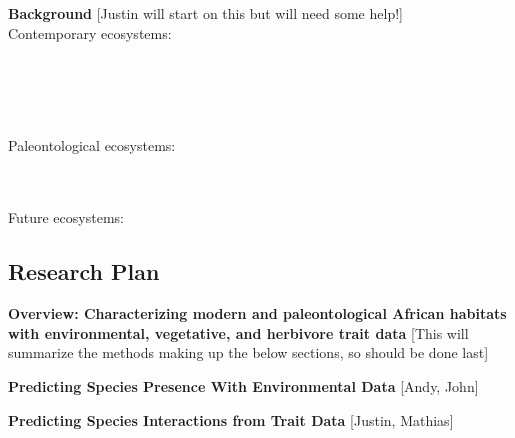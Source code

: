 \documentclass[11pt]{article}
\begin{document}
\noindent \textbf{Background} [Justin will start on this but will need some help!] \\ \nonumber
\noindent Contemporary ecosystems:\\  \\ \\ \\ \\ 

\vspace{2 mm}

\noindent Paleontological ecosystems: \\  \\  \\ 

\vspace{2 mm}

\noindent Future ecosystems: \\ 


\vspace{5 mm}


\subsection*{\large \textbf{Research Plan}}\vspace{-2mm}

\noindent \textbf{Overview: Characterizing modern and paleontological African habitats with environmental, vegetative, and herbivore trait data}
[This will summarize the methods making up the below sections, so should be done last]

\vspace{5 mm}

\noindent \textbf{Predicting Species Presence With Environmental Data}
[Andy, John]

\vspace{5 mm}

\noindent \textbf{Predicting Species Interactions from Trait Data}
[Justin, Mathias]
\end{document}
